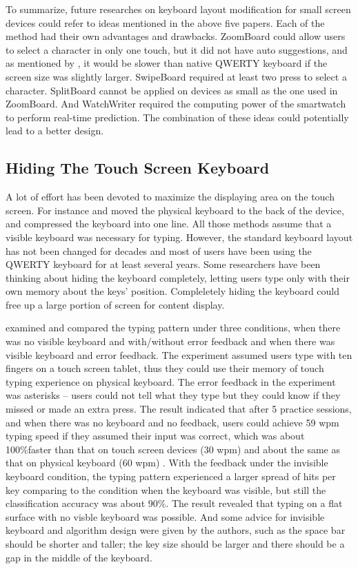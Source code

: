 \documentclass[11pt]{article}
\begin{document}
To summarize, future researches on keyboard layout modification for small screen devices could refer to ideas mentioned in the above five papers. Each of the method had their own advantages and drawbacks. ZoomBoard could allow users to select a character in only one touch, but it did not have auto suggestions, and as mentioned by \citet{10.1145/2702123.2702273}, it would be slower than native QWERTY keyboard if the screen size was slightly larger. SwipeBoard required at least two press to select a character. SplitBoard cannot be applied on devices as small as the one used in ZoomBoard. And WatchWriter required the computing power of the smartwatch to perform real-time prediction. The combination of these ideas could potentially lead to a better design.

\subsection{Hiding The Touch Screen Keyboard}
A lot of effort has been devoted to maximize the displaying area on the touch screen. For instance \citet{scott2010reartype} and \citet{backkey2012} moved the physical keyboard to the back of the device, and \citet{10.1145/2047196.2047257} compressed the keyboard into one line. All those methods assume that a visible keyboard was necessary for typing. However, the standard keyboard layout has not been changed for decades and most of users have been using the QWERTY keyboard for at least several years. Some researchers have been thinking about hiding the keyboard completely, letting users type only with their own memory about the keys' position. Compleletely hiding the keyboard could free up a large portion of screen for content display.

\citet{10.1145/1978942.1979301} examined and compared the typing pattern under three conditions, when there was no visible keyboard and with/without error feedback and when there was visible keyboard and error feedback. The experiment assumed users type with ten fingers on a touch screen tablet, thus they could use their memory of touch typing experience on physical keyboard. The error feedback in the experiment was asterisks -- users could not tell what they type but they could know if they missed or made an extra press. The result indicated that after 5 practice sessions, and when there was no keyboard and no feedback, users could achieve 59 wpm typing speed if they assumed their input was correct, which was about 100\%faster than that on touch screen devices (30 wpm) and about the same as that on physical keyboard (60 wpm) \citep{10.1145/3173574.3174220}. With the feedback under the invisible keyboard condition, the typing pattern experienced a larger spread of hits per key comparing to the condition when the keyboard was visible, but still the classification accuracy was about 90\%. The result revealed that typing on a flat surface with no visble keyboard was possible. And some advice for invisible keyboard and algorithm design were given by the authors, such as the space bar should be shorter and taller; the key size should be larger and there should be a gap in the middle of the keyboard.
\end{document}
